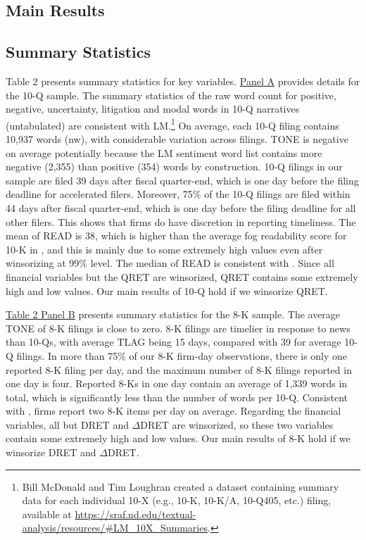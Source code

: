 \documentclass[letterpaper,12pt]{article}
\begin{document}
\begin{spacing}{1.5}
\section{Main Results}
\subsection{Summary Statistics}
\noindent Table 2 presents summary statistics for key variables. \hyperref[T2PA]{Panel A} provides details for the 10-Q sample. The summary statistics of the raw word count for positive, negative, uncertainty, litigation and modal words in 10-Q narratives (untabulated) are consistent with LM.\footnote{Bill McDonald and Tim Loughran created a dataset containing summary data for each individual 10-X (e.g., 10-K, 10-K/A, 10-Q405, etc.) filing, available at \url{https://sraf.nd.edu/textual-analysis/resources/\#LM_10X_Summaries}.} On average, each 10-Q filing contains 10,937 words (nw), with considerable variation across filings. TONE is negative on average potentially because the LM sentiment word list contains more negative (2,355) than positive (354) words by construction. 10-Q filings in our sample are filed 39 days after fiscal quarter-end, which is one day before the filing deadline for accelerated filers. Moreover, 75\% of the 10-Q filings are filed within 44 days after fiscal quarter-end, which is one day before the filing deadline for all other filers. This shows that firms do have discretion in reporting timeliness. The mean of READ is 38, which is higher than the average fog readability score for 10-K in , and this is mainly due to some extremely high values even after winsorizing at 99\% level. The median of READ is consistent with . Since all financial variables but the QRET are winsorized, QRET contains some extremely high and low values. Our main results of 10-Q hold if we winsorize QRET.

\hyperref[T2PB]{Table 2 Panel B} presents summary statistics for the 8-K sample. The average TONE of 8-K filings is close to zero. 8-K filings are timelier in response to news than 10-Qs, with average TLAG being 15 days, compared with 39 for average 10-Q filings. In more than 75\% of our 8-K firm-day observations, there is only one reported 8-K filing per day, and the maximum number of 8-K filings reported in one day is four. Reported 8-Ks in one day contain an average of 1,339 words in total, which is significantly less than the number of words per 10-Q. Consistent with , firms report two 8-K items per day on average. Regarding the financial variables, all but DRET and $\Delta$DRET are winsorized, so these two variables contain some extremely high and low values. Our main results of 8-K hold if we winsorize DRET and $\Delta$DRET.


\end{spacing}
\end{document}
